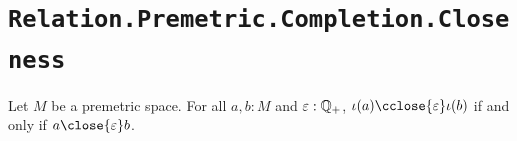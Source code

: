 \section{\texttt{Relation.Premetric.Completion.Closeness}}

\begin{lemma}
  \label{closeIffBall}
  Let $M$ be a premetric space. For all $a, b : M$ and $\varepsilon : \mathbb{Q}_{+}$, $\iota(a) \cclose{\varepsilon} \iota(b)$ if and only if $a \close{\varepsilon} b$.
\end{lemma}
